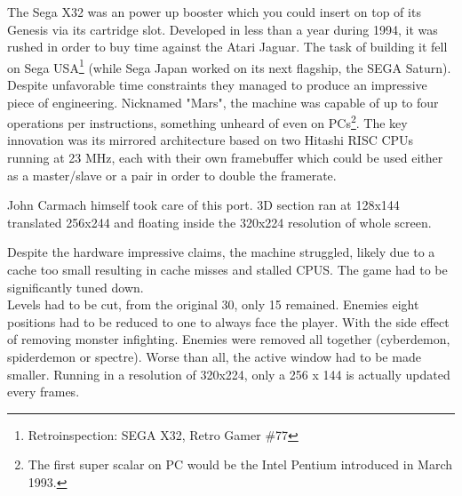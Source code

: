 The Sega X32 was an power up booster which you could insert on top of its Genesis via its cartridge slot. Developed in less than a year during 1994, it was rushed in order to buy time against the Atari Jaguar. The task of building it fell on Sega USA\footnote{Retroinspection: SEGA X32, Retro Gamer \#77} (while Sega Japan worked on its next flagship, the SEGA Saturn). Despite unfavorable time constraints they managed to produce an impressive piece of engineering. Nicknamed "Mars", the machine was capable of up to four operations per instructions, something unheard of even on PCs\footnote{The first super scalar on PC would be the Intel Pentium introduced in March 1993.}. The key innovation was its mirrored architecture based on two Hitashi RISC CPUs running at 23 MHz, each with their own framebuffer which could be used either as a master/slave or a pair in order to double the framerate.\\
\par
{}
\par
{}
\par
John Carmach himself took care of this port. 3D section ran at 128x144 translated 256x244 and floating inside the 320x224 resolution of whole screen.\\
\par
{}
\par
Despite the hardware impressive claims, the machine struggled, likely due to a cache too small resulting in cache misses and stalled CPUS. The game had to be significantly tuned down.\\ Levels had to be cut, from the original 30, only 15 remained. Enemies eight positions had to be reduced to one to always face the player. With the side effect of removing monster infighting. Enemies were removed all together (cyberdemon, spiderdemon or spectre). Worse than all, the active window had to be made smaller. Running in a resolution of 320x224, only a 256 x 144 is actually updated every frames.\\
